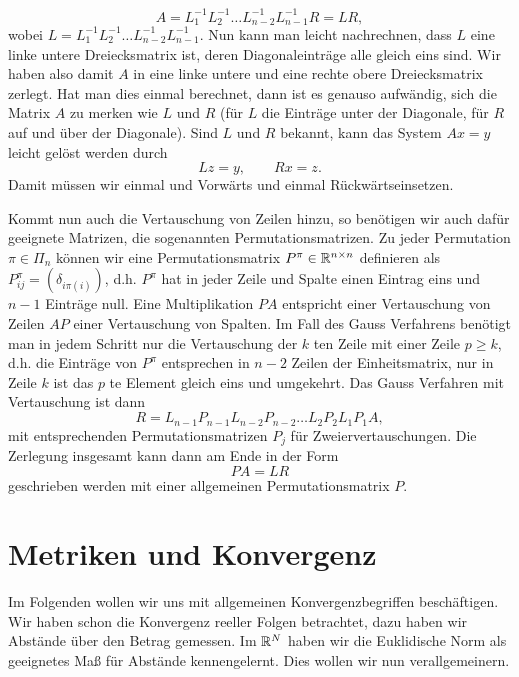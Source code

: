 \begin{equation*}
 A =  L_1^{-1}   L_2^{-1} \ldots  L_{n-2}^{-1} L_{n-1}^{-1} R  = L R,
\end{equation*}
wobei \(L= L_1^{-1}   L_2^{-1} \ldots  L_{n-2}^{-1} L_{n-1}^{-1}\). Nun kann man leicht nachrechnen, dass \(L\) eine linke untere Dreiecksmatrix ist, deren Diagonaleinträge alle gleich eins sind. Wir haben also damit \(A\) in eine linke untere und eine rechte obere Dreiecksmatrix zerlegt. Hat man dies einmal berechnet, dann ist es genauso aufwändig, sich die Matrix \(A\) zu merken wie \(L\) und \(R\) (für \(L\) die Einträge unter der Diagonale, für \(R\) auf und über der Diagonale). Sind \(L\) und \(R\) bekannt, kann das System \(Ax=y\) leicht gelöst werden durch
\begin{equation*}
 L z = y, \qquad Rx = z.
\end{equation*}
Damit müssen wir einmal und Vorwärts  und einmal Rückwärtseinsetzen.

Kommt nun auch die Vertauschung von Zeilen hinzu, so benötigen wir auch dafür geeignete Matrizen, die sogenannten Permutationsmatrizen. Zu jeder Permutation \(\pi \in \Pi_n\) können wir eine Permutationsmatrix \(P^\pi \in \mathbb{R}^{n \times n}\) definieren als \(P_{ij}^\pi = (\delta_{i\pi(i)})\), d.h. \(P^\pi\) hat in jeder Zeile und Spalte einen Eintrag eins und \(n-1\) Einträge null. Eine Multiplikation \(PA\) entspricht einer Vertauschung von Zeilen \(AP\) einer Vertauschung von Spalten. Im Fall des Gauss Verfahrens benötigt man in jedem Schritt nur die Vertauschung der \(k\) ten Zeile mit einer Zeile \(p \geq k\), d.h. die Einträge von \(P^\pi\) entsprechen in \(n-2\) Zeilen der Einheitsmatrix, nur in Zeile \(k\) ist das \(p\) te Element gleich eins und umgekehrt. Das Gauss Verfahren mit Vertauschung ist dann
\begin{equation*}
 R=L_{n-1} P_{n-1} L_{n-2} P_{n-2}\ldots L_2 P_2 L_1 P_1 A ,
\end{equation*}
mit entsprechenden Permutationsmatrizen \(P_j\) für Zweiervertauschungen. Die Zerlegung insgesamt kann dann am Ende in der Form
\begin{equation*}
 P A = L R
\end{equation*}
geschrieben werden mit einer allgemeinen Permutationsmatrix \(P\).


\chapter{Metriken und Konvergenz}
\label{\detokenize{metrik/metrik:metriken-und-konvergenz}}\label{\detokenize{metrik/metrik::doc}}
Im Folgenden wollen wir uns mit allgemeinen Konvergenzbegriffen beschäftigen. Wir haben schon die Konvergenz reeller Folgen betrachtet, dazu haben wir Abstände über den Betrag gemessen. Im \(\mathbb{R}^N\) haben wir die Euklidische Norm als geeignetes Maß für Abstände kennengelernt. Dies wollen wir nun verallgemeinern.


